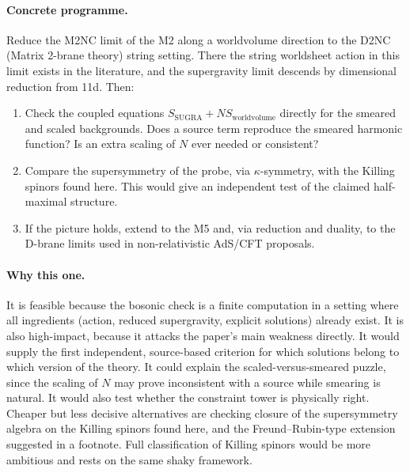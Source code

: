 \documentclass[11pt]{article}
\newcommand{\MNC}{M2NC}
\begin{document}
\paragraph{Concrete programme.}
Reduce the \MNC{} limit of the M2 along a worldvolume direction to the D2NC (Matrix 2-brane theory) string setting.
There the string worldsheet action in this limit exists in the literature, and the supergravity limit descends by dimensional reduction from 11d.
Then:
\begin{enumerate}[nosep]
\item Check the coupled equations $S_{\text{SUGRA}}+N S_{\text{worldvolume}}$ directly for the smeared and scaled backgrounds. Does a source term reproduce the smeared harmonic function? Is an extra scaling of $N$ ever needed or consistent?
\item Compare the supersymmetry of the probe, via $\kappa$-symmetry, with the Killing spinors found here. This would give an independent test of the claimed half-maximal structure.
\item If the picture holds, extend to the M5 and, via reduction and duality, to the D-brane limits used in non-relativistic AdS/CFT proposals.
\end{enumerate}

\paragraph{Why this one.}
It is feasible because the bosonic check is a finite computation in a setting where all ingredients (action, reduced supergravity, explicit solutions) already exist.
It is also high-impact, because it attacks the paper's main weakness directly.
It would supply the first independent, source-based criterion for which solutions belong to which version of the theory.
It could explain the scaled-versus-smeared puzzle, since the scaling of $N$ may prove inconsistent with a source while smearing is natural.
It would also test whether the constraint tower is physically right.
Cheaper but less decisive alternatives are checking closure of the supersymmetry algebra on the Killing spinors found here, and the Freund--Rubin-type extension suggested in a footnote.
Full classification of Killing spinors would be more ambitious and rests on the same shaky framework.
\end{document}
